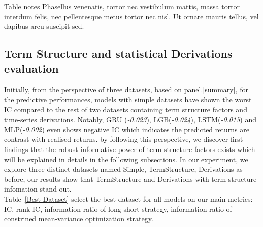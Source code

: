 \documentclass[10pt,letterpaper]{article}
\begin{document}
\begin{table}[!ht]
\begin{adjustwidth}{-2.25in}{0in}
\begin{flushleft} Table notes Phasellus venenatis, tortor nec vestibulum mattis, massa tortor interdum felis, nec pellentesque metus tortor nec nisl. Ut ornare mauris tellus, vel dapibus arcu suscipit sed.
\end{flushleft}
\label{summary}
\end{adjustwidth}
\end{table}




\subsection*{Term Structure and statistical Derivations evaluation}
Initially, from the perspective of three datasets, based on panel.\ref{summary}, for the predictive performances, models with simple datasets have shown the worst IC compared to the rest of two datasets containing term structure factors and time-series derivations. Notably, GRU (\textit{-0.023}), LGB(\textit{-0.024}), LSTM(\textit{-0.015}) and MLP(\textit{-0.002}) even shows negative IC which indicates the predicted returns are contrast with realised returns.
by following this perspective, we discover  first findings that the robust informative power of term structure factors exists which will be explained in details in the following subsections. In our experiment, we explore three distinct datasets named Simple, TermStructure, Derivations as before, our results show that TermStructure and Derivations with term structure infomation stand out.
\\Table~\ref{Best Dataset} select the best dataset for all models on our main metrics: IC, rank IC, information ratio of long short strategy, information ratio of constrined mean-variance optimization strategy.
\end{document}
